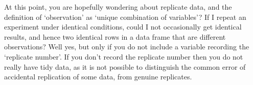 \documentclass[10pt] {article}
\theoremstyle{definition}
\begin{document}
At this point, you are hopefully wondering about replicate data, and the definition of `observation' as `unique combination of variables'? If I repeat an experiment under identical conditions, could I not occasionally get identical results, and hence two identical rows in a data frame that are different observations? Well yes, but only if you do not include a variable recording the `replicate number'. If you don't record the replicate number then you do not really have tidy data, as it is not possible to distinguish the common error of accidental replication of some data, from genuine replicates.

\end{document}

